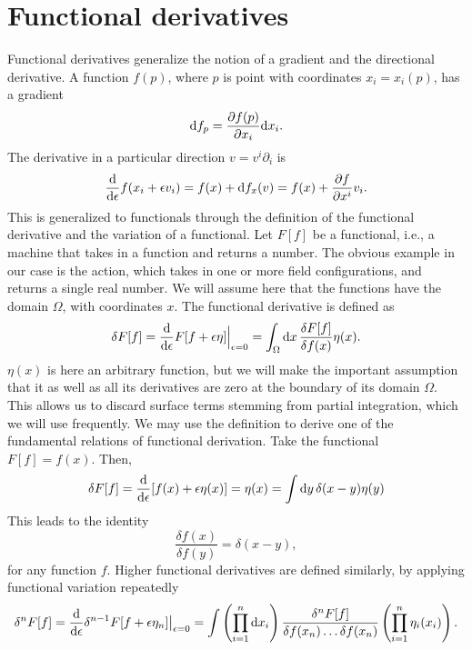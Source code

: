 \chapter{Functional derivatives}
\label{section:Functional derivative}
Functional derivatives generalize the notion of a gradient and the directional derivative.
A function $f(p)$, where $p$ is point with coordinates $x_i = x_i(p)$, has a gradient
\begin{equation}
    \dd f_p = \pdv{f(p)}{x_i} \dd x_i.
\end{equation}
The derivative in a particular direction $v = v^i \partial_i$ is 
\begin{equation}
    \dv{\epsilon} f(x_i + \epsilon v_i) = f(x) + \dd f_x (v) = f(x) + \pdv{f}{x^i}v_i.
\end{equation}
This is generalized to functionals through the definition of the functional derivative and the variation of a functional.
Let $F[f]$ be a functional, i.e., a machine that takes in a function and returns a number.
The obvious example in our case is the action, which takes in one or more field configurations, and returns a single real number.
We will assume here that the functions have the domain $\Omega$, with coordinates $x$.
The functional derivative is defined as
\begin{equation}
    \delta F[f]
    =
    \dv{\epsilon} F[f + \epsilon \eta] \Big|_{\epsilon = 0}
    = \int_\Omega \dd x \, \frac{\delta F[f]}{\delta f(x)} \eta(x).
\end{equation}
$\eta(x)$ is here an arbitrary function, but we will make the important assumption that it as well as all its derivatives are zero at the boundary of its domain $\Omega$.
This allows us to discard surface terms stemming from partial integration, which we will use frequently.
We may use the definition to derive one of the fundamental relations of functional derivation.
Take the functional $F[f] = f(x)$. 
Then,
\begin{equation}
    \label{Functional derivative delta identity}
    \delta F[f] = \dv{\epsilon} [f(x) + \epsilon \eta(x)] = \eta(x) = \int \dd y \, \delta(x - y) \eta(y)
\end{equation}
This leads to the identity
\begin{equation}
    \frac{\delta f(x)}{\delta f(y)} = \delta(x - y),
\end{equation}
for any function $f$.
Higher functional derivatives are defined similarly, by applying functional variation repeatedly
\begin{equation}
    \delta^n F[f] = \dv{\epsilon} \delta^{n-1}F[f + \epsilon \eta_n] \big|_{\epsilon=0}
    = \int \left(\prod_{i=1}^n \dd x_i\right)
    \frac{\delta^n F[f]}{ \delta f(x_n)\dots\delta f(x_n)} \left(\prod_{i=1}^n \eta_i(x_i)\right).
\end{equation}
